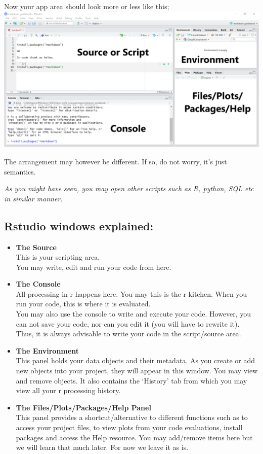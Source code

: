 \documentclass[
]{book}
\begin{document}
Now your app area should look more or less like this;\\
\includegraphics{tutorial_screenshots/rstudio_panels_4.png}

The arrangement may however be different. If so, do not worry, it's just semantics.

\emph{As you might have seen, you may open other scripts such as R, python, SQL etc in similar manner.}

\hypertarget{rstudio-windows-explained}{%
\subsection{Rstudio windows explained:}\label{rstudio-windows-explained}}

\begin{itemize}
\item
  \textbf{The Source}\\
  This is your scripting area.\\
  You may write, edit and run your code from here.
\item
  \textbf{The Console}\\
  All processing in r happens here. You may this is the r kitchen.
  When you run your code, this is where it is evaluated.\\
  You may also use the console to write and execute your code. However, you can not save your code, nor can you edit it (you will have to rewrite it). Thus, it is always advisable to write your code in the script/source area.\\
\item
  \textbf{The Environment}\\
  This panel holds your data objects and their metadata. As you create or add new objects into your project, they will appear in this window. You may view and remove objects.
  It also contains the `History' tab from which you may view all your r processing history.\\
\item
  \textbf{The Files/Plots/Packages/Help Panel}\\
  This panel provides a shortcut/alternative to different functions such as to access your project files, to view plots from your code evaluations, install packages and access the Help resource. You may add/remove items here but we will learn that much later. For now we leave it as is.
\end{itemize}
\end{document}
